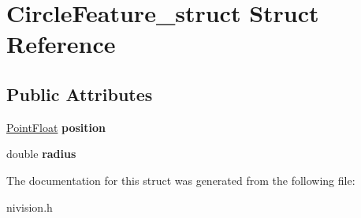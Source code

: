 \hypertarget{structCircleFeature__struct}{
\section{CircleFeature\_\-struct Struct Reference}
\label{structCircleFeature__struct}
}
\subsection*{Public Attributes}
\begin{DoxyCompactItemize}
\item 
\hypertarget{structCircleFeature__struct_aa34aafa6b2b2462e2c330754e37bb0fd}{
\hyperlink{structPointFloat__struct}{PointFloat} {\bfseries position}}
\label{structCircleFeature__struct_aa34aafa6b2b2462e2c330754e37bb0fd}

\item 
\hypertarget{structCircleFeature__struct_a12933357d4f3d65d1106413546f56586}{
double {\bfseries radius}}
\label{structCircleFeature__struct_a12933357d4f3d65d1106413546f56586}

\end{DoxyCompactItemize}


The documentation for this struct was generated from the following file:\begin{DoxyCompactItemize}
\item 
nivision.h\end{DoxyCompactItemize}
